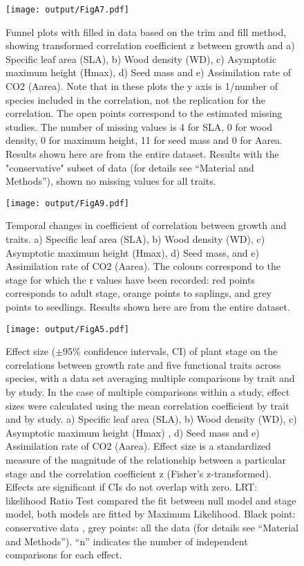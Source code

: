 \documentclass[10pt,twoside]{article}\usepackage[]{graphicx}\usepackage[]{color}
\begin{document}
\begin{figure}[h!]
\centering
\texttt{[image: output/FigA7.pdf]}
\caption{Funnel plots with filled in data based on the trim and fill method, showing transformed correlation coefficient z between growth and a) Specific leaf area (SLA), b) Wood density (WD), c) Asymptotic maximum height (Hmax), d) Seed mass and e) Assimilation rate of CO2 (Aarea). Note that in these plots the y axis is 1/number of species included in the correlation, not the replication for the correlation. The open points correspond to the estimated missing studies. The number of missing values is 4 for SLA, 0 for wood density, 0 for maximum height, 11 for seed mass and 0 for Aarea. Results shown here are from the entire dataset. Results with the "conservative" subset of data (for details see ``Material and Methods''), shown no missing values for all traits.}
\label{fig:figA7}
\end{figure}


\begin{figure}[h!]
\centering
\texttt{[image: output/FigA9.pdf]}
\caption{Temporal changes in coefficient of correlation between growth and traits. a) Specific leaf area (SLA), b) Wood density (WD), c) Asymptotic maximum height (Hmax), d) Seed mass, and e) Assimilation rate of CO2 (Aarea). The colours correspond to the stage for which the r values have been recorded: red points corresponds to adult stage, orange points to saplings, and grey points to seedlings. Results shown here are from the entire dataset.}
\label{fig:figA9}
\end{figure}


\begin{figure}[h!]
\centering
\texttt{[image: output/FigA5.pdf]}
\caption{Effect size ($\pm$95\% confidence intervals, CI) of plant stage on the correlations between growth rate and five functional traits across species, with a data set averaging multiple comparisons by trait and by study. In the case of multiple comparisons within a study, effect sizes were calculated using the mean correlation coefficient by trait and by study. a) Specific leaf area (SLA), b) Wood density (WD), c) Asymptotic maximum height (Hmax) , d) Seed mass and e) Assimilation rate of CO2 (Aarea). Effect size is a standardized measure of the magnitude of the relationship between a particular stage and the correlation coefficient z (Fisher's z-transformed). Effects are significant if CIs do not overlap with zero. LRT: likelihood Ratio Test compared the fit between null model and stage model, both models are fitted by Maximum Likelihood. Black point: conservative data , grey points: all the data (for details see ``Material and Methods''). ``n'' indicates the number of independent comparisons for each effect.}
\label{fig:figA5}
\end{figure}
\end{document}

